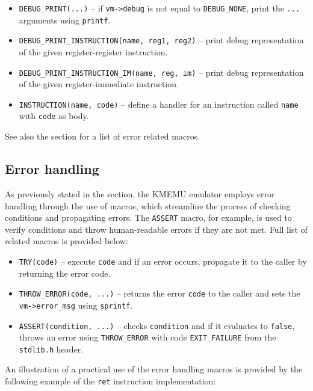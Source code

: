 \documentclass[10pt,a4paper,final]{article}
\newcommand{\code}[1]{\texttt{#1}}
\newenvironment{note}[1]{\begin{notes}\item #1}{\end{notes}}
\begin{document}
\begin{itemize}
    \item \code{DEBUG_PRINT(...)} -- if \code{vm->debug} is not equal to
        \code{DEBUG_NONE}, print the \code{...} arguments using \code{printf}.
    \item \code{DEBUG_PRINT_INSTRUCTION(name, reg1, reg2)} -- print debug
        representation of the given register-register instruction.
    \item \code{DEBUG_PRINT_INSTRUCTION_IM(name, reg, im)} -- print debug
        representation of the given register-immediate instruction.

    \item \code{INSTRUCTION(name, code)} -- define a handler for an instruction
        called \code{name} with \code{code} as body.
\end{itemize}

\begin{note}
    See also the section  for a list of error related
    macros.
\end{note}

\subsection{Error handling}
\label{sec:errors}

As previously stated in the  section, the KMEMU emulator
employs error handling through the use of macros, which streamline the process
of checking conditions and propagating errors. The \code{ASSERT} macro, for
example, is used to verify conditions and throw human-readable errors if they
are not met. Full list of related macros is provided below:

\begin{itemize}
\item \code{TRY(code)} -- execute \code{code} and if an error occurs, propagate
    it to the caller by returning the error code.
\item \code{THROW_ERROR(code, ...)} -- returns the error \code{code} to the
    caller and sets the \code{vm->error_msg} using \code{sprintf}.
\item \code{ASSERT(condition, ...)} -- checks \code{condition} and if it
    evaluates to \code{false}, throws an error using \code{THROW_ERROR} with
    code \code{EXIT_FAILURE} from the \code{stdlib.h} header.
\end{itemize}

An illustration of a practical use of the error handling macros is provided by
the following example of the \code{ret} instruction implementation:
\end{document}
